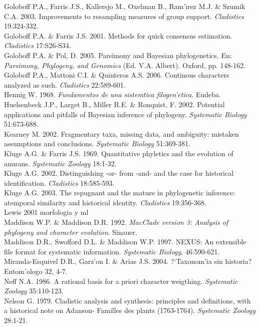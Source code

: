 Goloboff P.A., Farris J.S., Kallersjo M., Oxelman B., Ram'irez M.J. \& Szumik C.A.  2003. Improvements to resampling measures of group support. \textit{Cladistics} 19:324-332.\\
Goloboff P.A. \& Farris J.S. 2001. Methods for quick consensus estimation. \textit{Cladistics} 17:S26-S34.\\
Goloboff P.A. \& Pol, D. 2005. Parsimony and Bayesian phylogenetics. En: \textit{Parsimony, Phylogeny, and Genomics} (Ed. V.A. Albert). Oxford, pp. 148-162.\\
Goloboff P.A., Mattoni C.I. \& Quinteros A.S. 2006. Continous characters analyzed as such. \textit{Cladistics} 22:589-601.\\
Hennig W. 1968. \textit{Fundamentos de una sistemtica filogen'etica}. Eudeba.\\
Huelsenbeck J.P., Larget B., Miller R.E. \& Ronquist, F. 2002. Potential applications and pitfalls of Bayesian inference of phylogeny. \textit{Systematic Biology} 51:673-688.\\
Kearney M. 2002. Fragmentary taxa, missing data, and ambiguity: mistaken assumptions and conclusions. \textit{Systematic Biology} 51:369-381.\\
Kluge A.G. \& Farris J.S. 1969. Quantitative phyletics and the evolution of anurans. \textit{Systematic Zoology} 18:1-32.\\
Kluge A.G. 2002. Distinguishing -or- from -and- and the case for historical identification. \textit{Cladistics} 18:585-593.\\
Kluge A.G. 2003. The repugnant and the mature in phylogenetic inference: atemporal similarity and historical identity. \textit{Cladistics} 19:356-368.\\ 
Lewis 2001 morfologia y ml\\
Maddison W.P. \& Maddison D.R. 1992. \textit{MacClade version 3: Analysis of phylogeny and character evolution}. Sinauer.\\
Maddison D.R., Swofford D.L. \& Maddison W.P. 1997. NEXUS: An extensible file format for systematic information. \textit{Systematic Biology}, 46:590-621.\\
Miranda-Esquivel D.R., Garz'on I. \& Arias J.S. 2004. ?`Taxonom'ia sin historia? Entom'ologo 32, 4-7.\\
Neff N.A. 1986. A rational basis for a priori character weigthing. \textit{Systematic Zoology} 35:110-123.\\
Nelson G. 1979. Cladistic analysis and synthesis: principles and definitions, with a historical note on Adanson- Familles des plants (1763-1764). \textit{Systematic Zoology} 28:1-21.\\

